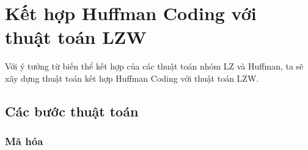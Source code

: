 \chapter[Kết hợp Huffman Coding với thuật toán LZW]{Kết hợp Huffman Coding với\\ thuật toán LZW}

Với ý tưởng từ biến thể kết hợp của các thuật toán nhóm LZ và Huffman, ta sẽ xây dựng thuật toán kết hợp Huffman Coding với thuật toán LZW.

\section{Các bước thuật toán}

    \subsection{Mã hóa}
